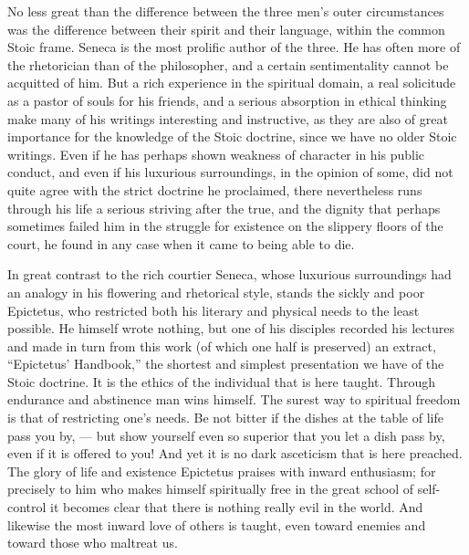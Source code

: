\documentclass[12pt,a4paper,openany]{book}
\newcommand{\opage}[1]{\marginnote{\footnotesize\textit{[#1]}}}
\begin{document}
No less great than the difference between the three men's
outer circumstances was the difference between their spirit and their language,
within the common Stoic frame. Seneca is the
most prolific author of the three. He has often more of the rhetorician than
of the philosopher, and a certain sentimentality cannot be acquitted
of him. But a rich experience in the spiritual domain, a real
solicitude as a pastor of souls for his friends, and a serious absorption in
ethical thinking make many of his writings interesting and
instructive, as they are also of great importance
for the knowledge of the Stoic doctrine, since we have no older Stoic writings.
Even if he has perhaps shown weakness of character in his
public conduct, and even if his luxurious surroundings, in the opinion of
some, did not quite agree with the strict doctrine
he proclaimed, there nevertheless runs through his life a
serious striving after the true, and the dignity that perhaps
sometimes failed him in the struggle for existence on the
\opage{166}slippery floors of the court, he found in any case when it
came to being able to die.

In great contrast to the rich courtier Seneca, whose
luxurious surroundings had an analogy in his flowering and
rhetorical style, stands the sickly and poor Epictetus,
who restricted both his literary and physical
needs to the least possible. He himself wrote nothing,
but one of his disciples recorded his lectures and made
in turn from this work (of which one half is preserved) an extract,
``Epictetus' Handbook,'' the shortest and simplest presentation
we have of the Stoic doctrine. It is the ethics of the individual that
is here taught. Through endurance and abstinence
man wins himself. The surest way to spiritual freedom
is that of restricting one's needs. Be not bitter if
the dishes at the table of life pass you by, --- but show yourself even
so superior that you let a dish pass by, even if it
is offered to you! And yet it is no dark asceticism that is here preached.
The glory of life and existence Epictetus praises with
inward enthusiasm; for precisely to him who makes himself spiritually free in
the great school of self-control it becomes clear that there is nothing
really evil in the world. And likewise the
most inward love of others is taught, even toward enemies and toward those who
maltreat us.
\end{document}
